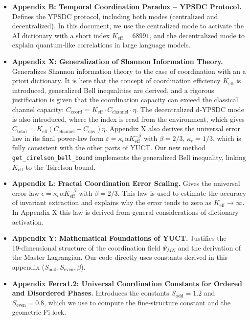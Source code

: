 \documentclass[12pt,a4paper]{article}
\begin{document}
	\begin{itemize}
		\item \textbf{Appendix B: Temporal Coordination Paradox – YPSDC Protocol.}  
		Defines the YPSDC protocol, including both modes (centralized and decentralized). In this document, we use the centralized mode to activate the AI dictionary with a short index \(K_{\mathrm{eff}} = 68991\), and the decentralized mode to explain quantum‑like correlations in large language models.
		
		\item \textbf{Appendix X: Generalization of Shannon Information Theory.}  
		Generalizes Shannon information theory to the case of coordination with an a priori dictionary. It is here that the concept of coordination efficiency \(K_{\mathrm{eff}}\) is introduced, generalized Bell inequalities are derived, and a rigorous justification is given that the coordination capacity can exceed the classical channel capacity: \(C_{\text{coord}} = K_{\mathrm{eff}} \cdot C_{\text{channel}} \cdot \eta\). The decentralized d‑YPSDC mode is also introduced, where the index is read from the environment, which gives \(C_{\text{total}} = K_{\mathrm{eff}}(C_{\text{channel}} + C_{\text{env}})\eta\). Appendix X also derives the universal error law in its final power‑law form \(\varepsilon = \kappa_c \alpha K_{\mathrm{eff}}^{-\beta}\) with \(\beta=2/3\), \(\kappa_c=1/3\), which is fully consistent with the other parts of YUCT. Our new method \texttt{get\_cirelson\_bell\_bound} implements the generalized Bell inequality, linking \(K_{\mathrm{eff}}\) to the Tsirelson bound.
		
		\item \textbf{Appendix L: Fractal Coordination Error Scaling.}  
		Gives the universal error law \(\epsilon = \kappa_c \alpha K_{\mathrm{eff}}^{-\beta}\) with \(\beta = 2/3\). This law is used to estimate the accuracy of invariant extraction and explains why the error tends to zero as \(K_{\mathrm{eff}} \to \infty\). In Appendix X this law is derived from general considerations of dictionary activation.
		
		\item \textbf{Appendix Y: Mathematical Foundations of YUCT.}  
		Justifies the 19‑dimensional structure of the coordination field \(\Psi_{MN}\) and the derivation of the Master Lagrangian. Our code directly uses constants derived in this appendix (\(S_{\mathrm{odd}}, S_{\mathrm{even}}, \beta\)).
		
		\item \textbf{Appendix Ferra1.2: Universal Coordination Constants for Ordered and Disordered Phases.}  
		Introduces the constants \(S_{\mathrm{odd}} = 1.2\) and \(S_{\mathrm{even}} = 0.8\), which we use to compute the fine‑structure constant and the geometric Pi lock.
		

\end{itemize}
\end{document}
